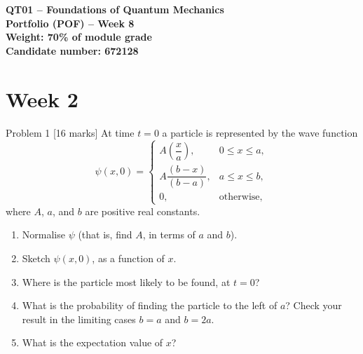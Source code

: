 \documentclass[12pt]{article}
\begin{document}
\begin{center}
	{\Large\bfseries QT01 -- Foundations of Quantum Mechanics\\[0.2em]
		Portfolio (POF) -- Week 8\\[0.3em]
		{\normalsize Weight: 70\% of module grade}\\[1em]
		Candidate number: 672128
	}
\end{center}


\section{Week 2}

\begin{problembox}{Problem 1 \hfill [16 marks]}
At time $t=0$ a particle is represented by the wave function
\[
\psi(x,0)=
\begin{cases}
A\left(\dfrac{x}{a}\right), & 0\le x\le a,\\[0.8em]
A\dfrac{(b-x)}{(b-a)}, & a\le x\le b,\\[0.8em]
0, & \text{otherwise},
\end{cases}
\]
where $A$, $a$, and $b$ are positive real constants.

\begin{enumerate}
    \item Normalise $\psi$ (that is, find $A$, in terms of $a$ and $b$).
    \item Sketch $\psi(x,0)$, as a function of $x$.
    \item Where is the particle most likely to be found, at $t=0$?
    \item What is the probability of finding the particle to the left of $a$? Check your result in the limiting cases $b=a$ and $b=2a$.
    \item What is the expectation value of $x$?
\end{enumerate}
\end{problembox}
\end{document}
